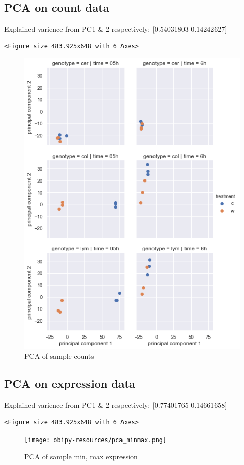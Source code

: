 \documentclass[a4paper]{article}
\begin{document}
\subsection{PCA on count data}
\label{sec:orgb44efb5}

Explained varience from PC1 \& 2 respectively:
[0.54031803 0.14242627]

\begin{verbatim}
<Figure size 483.925x648 with 6 Axes>
\end{verbatim}

\begin{figure}[htbp]
\centering
\includegraphics[width=15cm]{obipy-resources/pca.png}
\caption{\label{pca}
PCA of sample counts}
\end{figure}

\clearpage

\subsection{PCA on expression data}
\label{sec:org09358e9}

Explained varience from PC1 \& 2 respectively:
[0.77401765 0.14661658]

\begin{verbatim}
<Figure size 483.925x648 with 6 Axes>
\end{verbatim}

\begin{figure}[htbp]
\centering
\texttt{[image: obipy-resources/pca\_minmax.png]}
\caption{\label{pca_both}
PCA of sample min, max expression}
\end{figure}
\end{document}
